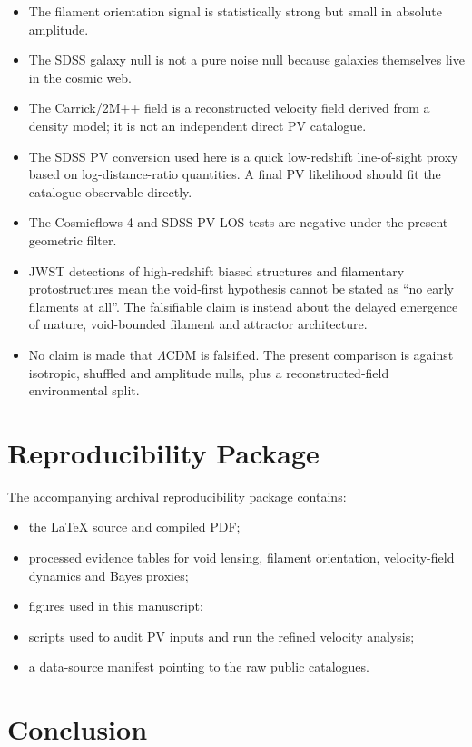 \documentclass[11pt,a4paper]{article}
\begin{document}
\begin{itemize}[leftmargin=1.2cm]
  \item The filament orientation signal is statistically strong but small in absolute amplitude.
  \item The SDSS galaxy null is not a pure noise null because galaxies themselves live in the cosmic web.
  \item The Carrick/2M++ field is a reconstructed velocity field derived from a density model; it is not an independent direct PV catalogue.
  \item The SDSS PV conversion used here is a quick low-redshift line-of-sight proxy based on log-distance-ratio quantities. A final PV likelihood should fit the catalogue observable directly.
  \item The Cosmicflows-4 and SDSS PV LOS tests are negative under the present geometric filter.
  \item JWST detections of high-redshift biased structures and filamentary protostructures mean the void-first hypothesis cannot be stated as ``no early filaments at all''. The falsifiable claim is instead about the delayed emergence of mature, void-bounded filament and attractor architecture.
  \item No claim is made that $\Lambda$CDM is falsified. The present comparison is against isotropic, shuffled and amplitude nulls, plus a reconstructed-field environmental split.
\end{itemize}

\section{Reproducibility Package}

The accompanying archival reproducibility package contains:
\begin{itemize}[leftmargin=1.2cm]
  \item the LaTeX source and compiled PDF;
  \item processed evidence tables for void lensing, filament orientation, velocity-field dynamics and Bayes proxies;
  \item figures used in this manuscript;
  \item scripts used to audit PV inputs and run the refined velocity analysis;
  \item a data-source manifest pointing to the raw public catalogues.
\end{itemize}

\section{Conclusion}
\end{document}
